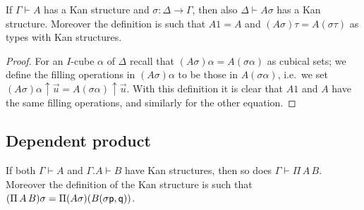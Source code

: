 \documentclass[10pt,a4paper]{article}
\newcommand{\pp}{{\sf p}}
\newcommand{\qq}{{\sf q}}
\newcommand{\rup}[1]{#1{\uparrow}}
\begin{document}
\begin{theorem}
  If $\Gamma \vdash A$ has a Kan structure and $\sigma \colon \Delta
  \to \Gamma$, then also $\Delta \vdash A \sigma$ has a Kan structure.
  Moreover the definition is such that $A 1 = A$ and $(A \sigma) \tau
  = A (\sigma \tau)$ as types with Kan structures.
\end{theorem}
\begin{proof}
  For an $I$-cube $\alpha$ of $\Delta$ recall that $(A \sigma) \alpha
  = A (\sigma \alpha)$ as cubical sets; we define the filling
  operations in $(A \sigma) \alpha$ to be those in $A (\sigma
  \alpha)$, i.e.\ we set $\rup{(A \sigma) \alpha} {\vec u} = \rup {A
    (\sigma \alpha)} {\vec u}$.  With this definition it is clear that
  $A 1$ and $A$ have the same filling operations, and similarly for
  the other equation.
\end{proof}

\subsection{Dependent product}

\begin{theorem}
  If both $\Gamma\vdash A$ and $\Gamma.A\vdash B$ have Kan structures,
  then so does $\Gamma\vdash\Pi\,A\,B$.  Moreover the definition of
  the Kan structure is such that $(\Pi\,A\,B) \sigma = \Pi (A \sigma)
  (B (\sigma \pp, \qq))$.
\end{theorem}
\end{document}
